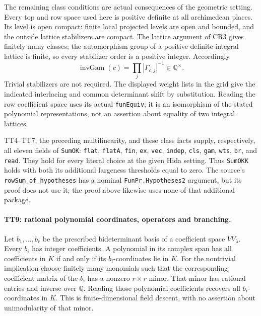 The remaining class conditions are actual consequences of the
geometric setting. Every top and row space used here is positive
definite at all archimedean places. Its level is open compact:
finite local projected levels are open and bounded, and the
outside lattice stabilizers are compact. The lattice argument of
CR3 gives finitely many classes; the automorphism group of a
positive definite integral lattice is finite, so every stabilizer
order is a positive integer. Accordingly
\[
             \operatorname{invGam}(c)
                    =\prod_j|\Gamma_{c,j}|^{-1}\in\mathbb Q^\times.
                                                                  \tag{TT.15}
\]
Trivial stabilizers are not required. The displayed weight lists
in the grid give the indicated interlacing and common determinant
shift by substitution. Reading the row coefficient space uses its
actual \texttt{funEquiv}; it is an isomorphism of the stated
polynomial representations, not an assertion about equality of
two integral lattices.

TT4--TT7, the preceding multilinearity, and these class facts
supply, respectively, all eleven fields of \texttt{SumOK}:
\texttt{flat}, \texttt{flatA}, \texttt{fin}, \texttt{ex},
\texttt{vec}, \texttt{indep}, \texttt{cls}, \texttt{gam},
\texttt{wts}, \texttt{br}, and \texttt{read}. They hold for every
literal choice at the given Hida setting. Thus \texttt{SumOKK}
holds with both its additional largeness thresholds equal to zero.
The source's \texttt{rowSum\_of\_hypotheses} has a nominal
\texttt{FunPr.Hypotheses2} argument, but its proof does not use it;
the proof above likewise uses none of that additional package.

\paragraph{TT9: rational polynomial coordinates, operators and branching.}
Let $b_1,\ldots,b_r$ be the prescribed bideterminant basis of a
coefficient space $VV_\lambda$. Every $b_i$ has integer
coefficients. A polynomial in its complex span has all coefficients
in $K$ if and only if its $b_i$-coordinates lie in $K$. For the
nontrivial implication choose finitely many monomials such that
the corresponding coefficient matrix of the $b_i$ has a nonzero
$r\times r$ minor. That minor has rational entries and inverse
over $\mathbb Q$. Reading those polynomial coefficients recovers
all $b_i$-coordinates in $K$. This is finite-dimensional field
descent, with no assertion about unimodularity of that minor.

